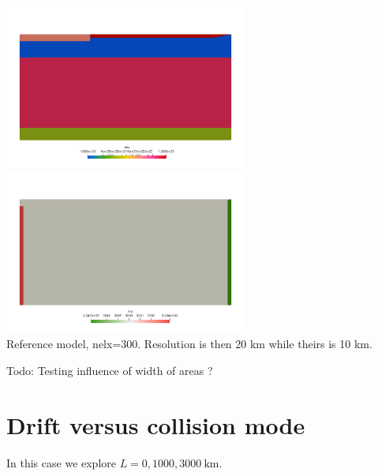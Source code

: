 \begin{center}
\includegraphics[width=8cm]{python_codes/fieldstone_143/results/resolutions/eta}
\includegraphics[width=8cm]{python_codes/fieldstone_143/results/resolutions/rho}\\
{\captionfont Reference model, nelx=300. Resolution is then 20 km while theirs is 10 km.}
\end{center}



Todo: Testing influence of width of areas ?

\newpage
\section*{Drift versus collision mode}

In this case we explore $L=0,1000,3000~\si{\km}$.








































